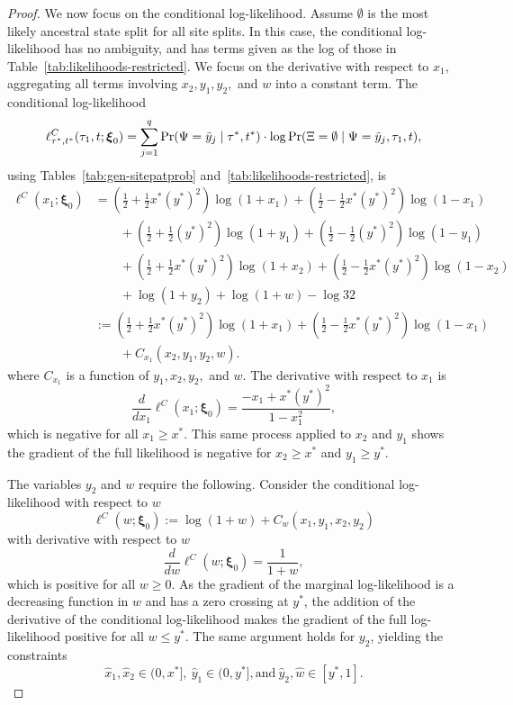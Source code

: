\begin{proof}
We now focus on the conditional log-likelihood.
Assume $\emptyset$ is the most likely ancestral state split for all site splits.
In this case, the conditional log-likelihood has no ambiguity, and has terms given as the log of those in Table~\ref{tab:likelihoods-restricted}.
We focus on the derivative with respect to $x_1$, aggregating all terms involving $x_2,y_1,y_2,$ and $w$ into a constant term.
The conditional log-likelihood
\[
\ell^C_{\tau^*,t^*}(\tau_1, t; \boldsymbol\xi_0) = \sum_{j=1}^q \Pr(\Psi=\tilde{y}_j \mid \tau^*, t^*)\cdot\log \Pr(\Xi=\emptyset \mid \Psi = \tilde{y}_j, \tau_1, t),
\]
using Tables~\ref{tab:gen-sitepatprob} and~\ref{tab:likelihoods-restricted}, is
\begin{align*}
\ell^C(x_1; \boldsymbol\xi_0) &= \left(\frac{1}{2}+\frac{1}{2}x^*(y^*)^2\right)\log(1+x_1) + \left(\frac{1}{2}-\frac{1}{2}x^*(y^*)^2\right)\log(1-x_1)\\
&\qquad + \left(\frac{1}{2}+\frac{1}{2}(y^*)^2\right)\log(1+y_1) + \left(\frac{1}{2}-\frac{1}{2}(y^*)^2\right)\log(1-y_1)\\
&\qquad + \left(\frac{1}{2}+\frac{1}{2}x^*(y^*)^2\right)\log(1+x_2) + \left(\frac{1}{2}-\frac{1}{2}x^*(y^*)^2\right)\log(1-x_2)\\
&\qquad + \log(1+y_2) + \log(1+w) - \log 32\\
&:= \left(\frac{1}{2}+\frac{1}{2}x^*(y^*)^2\right)\log(1+x_1) + \left(\frac{1}{2}-\frac{1}{2}x^*(y^*)^2\right)\log(1-x_1)\\
&\qquad + C_{x_1}(x_2,y_1,y_2,w).
\end{align*}
where $C_{x_1}$ is a function of $y_1,x_2,y_2,$ and $w$.
The derivative with respect to $x_1$ is
\[
\frac{d}{dx_1} \ell^C(x_1; \boldsymbol\xi_0) = \frac{-x_1+x^*(y^*)^2}{1-x_1^2},
\]
which is negative for all $x_1 \ge x^*$.
This same process applied to $x_2$ and $y_1$ shows the gradient of the full likelihood is negative for $x_2 \ge x^*$ and $y_1 \ge y^*$.

The variables $y_2$ and $w$ require the following.
Consider the conditional log-likelihood with respect to $w$
\[
\ell^C(w; \boldsymbol\xi_0) := \log(1+w) + C_{w}(x_1,y_1,x_2,y_2)
\]
with derivative with respect to $w$
\[
\frac{d}{dw} \ell^C(w; \boldsymbol\xi_0) = \frac{1}{1+w},
\]
which is positive for all $w \ge 0$.
As the gradient of the marginal log-likelihood is a decreasing function in $w$ and has a zero crossing at $y^*$, the addition of the derivative of the conditional log-likelihood makes the gradient of the full log-likelihood positive for all $w \le y^*$.
The same argument holds for $y_2$, yielding the constraints
\[
\hat{x}_1,\hat{x}_2 \in (0, x^*], \ \hat{y}_1 \in (0, y^*], \text{and}\ \hat{y}_2,\hat{w} \in [y^*, 1].
\]
\end{proof}

